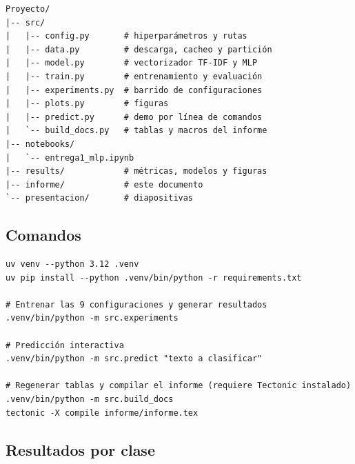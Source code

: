 \documentclass[11pt,letterpaper]{article}
\begin{document}
\begin{verbatim}
Proyecto/
|-- src/
|   |-- config.py       # hiperparámetros y rutas
|   |-- data.py         # descarga, cacheo y partición
|   |-- model.py        # vectorizador TF-IDF y MLP
|   |-- train.py        # entrenamiento y evaluación
|   |-- experiments.py  # barrido de configuraciones
|   |-- plots.py        # figuras
|   |-- predict.py      # demo por línea de comandos
|   `-- build_docs.py   # tablas y macros del informe
|-- notebooks/
|   `-- entrega1_mlp.ipynb
|-- results/            # métricas, modelos y figuras
|-- informe/            # este documento
`-- presentacion/       # diapositivas
\end{verbatim}

\subsection*{Comandos}

\begin{verbatim}
uv venv --python 3.12 .venv
uv pip install --python .venv/bin/python -r requirements.txt

# Entrenar las 9 configuraciones y generar resultados
.venv/bin/python -m src.experiments

# Predicción interactiva
.venv/bin/python -m src.predict "texto a clasificar"

# Regenerar tablas y compilar el informe (requiere Tectonic instalado)
.venv/bin/python -m src.build_docs
tectonic -X compile informe/informe.tex
\end{verbatim}

\subsection*{Resultados por clase}


\end{document}
